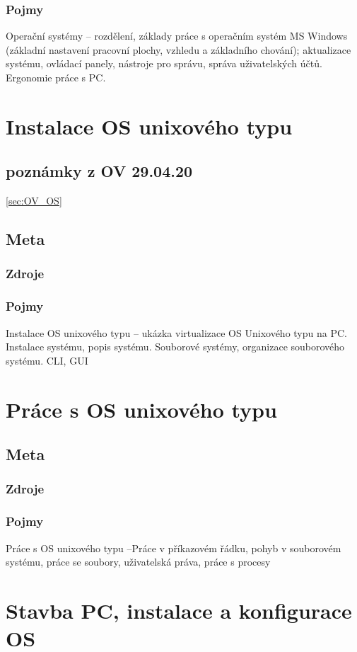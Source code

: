 \documentclass[12pt]{article}
\begin{document}
\subsubsection{Pojmy}
Operační systémy – rozdělení, základy práce s operačním systém MS Windows (základní nastavení pracovní plochy, vzhledu a základního chování); aktualizace systému, ovládací panely, nástroje pro správu, správa
uživatelských účtů. Ergonomie práce s PC.

\section{Instalace OS unixového typu}
\subsection{poznámky z OV 29.04.20}
\ref{sec:OV_OS} 
\subsection{Meta}
\subsubsection{Zdroje}
\subsubsection{Pojmy}
Instalace OS unixového typu – ukázka virtualizace OS Unixového typu na PC. Instalace systému, popis systému. Souborové systémy, organizace souborového systému. CLI, GUI

\section{Práce s OS unixového typu}
\subsection{Meta}
\subsubsection{Zdroje}
\subsubsection{Pojmy}
Práce s OS unixového typu –Práce v příkazovém řádku, pohyb v souborovém systému, práce se soubory, uživatelská práva, práce s procesy

\section{Stavba PC, instalace a konfigurace OS}
\end{document}
